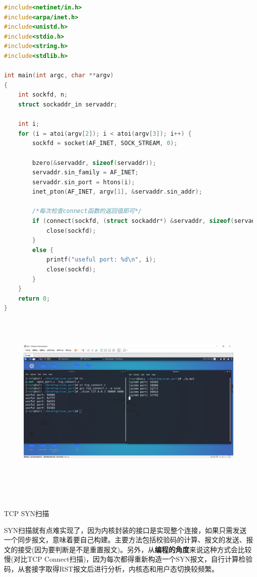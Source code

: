 \documentclass[11pt,a4paper]{article}
\begin{document}
\begin{lstlisting}[language=C]
#include<netinet/in.h>
#include<arpa/inet.h>
#include<unistd.h>
#include<stdio.h>
#include<string.h>
#include<stdlib.h>

int main(int argc, char **argv)
{
    int sockfd, n;
    struct sockaddr_in servaddr;

    int i;
    for (i = atoi(argv[2]); i < atoi(argv[3]); i++) {
        sockfd = socket(AF_INET, SOCK_STREAM, 0);

        bzero(&servaddr, sizeof(servaddr));
        servaddr.sin_family = AF_INET;
        servaddr.sin_port = htons(i);
        inet_pton(AF_INET, argv[1], &servaddr.sin_addr);

        /*每次检查connect函数的返回值即可*/
        if (connect(sockfd, (struct sockaddr*) &servaddr, sizeof(servaddr)) < 0) {
            close(sockfd);
        }
        else {
            printf("useful port: %d\n", i);
            close(sockfd);
        }
    }
    return 0; 
}
\end{lstlisting}
\begin{figure}[H]
    \centering
    \includegraphics[width=16cm,height=8.7cm]{./figure/25.png}
\end{figure}
\qquad\\
\begin{center}
TCP SYN扫描
\end{center}
SYN扫描就有点难实现了，因为内核封装的接口是实现整个连接，如果只需发送一个同步报文，意味着要自己构建。主要方法包括校验码的计算、报文的发送、报文的接受(因为要判断是不是重置报文)。另外，从\textbf{编程的角度}来说这种方式会比较慢(对比TCP Connect扫描)，因为每次都得重新构造一个SYN报文，自行计算检验码，从套接字取得RST报文后进行分析，内核态和用户态切换较频繁。
\end{document}
